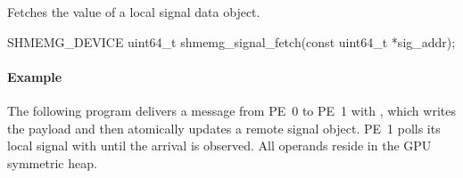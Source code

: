 \label{subsec:gc_signal_fetch}

Fetches the value of a local signal data object.

\begin{apidefinition}
\begin{Csynopsis}
SHMEMG_DEVICE uint64_t shmemg_signal_fetch(const uint64_t *sig_addr);
\end{Csynopsis}

\begin{apiarguments}
\end{apiarguments}


\end{apidefinition}

\paragraph*{\textbf{Example}}\mbox{}\par\nobreak
The following program delivers a message from \ac{PE}~0 to \ac{PE}~1 with
, which writes the payload and then atomically
updates a remote signal object. \ac{PE}~1 polls its local signal with
 until the arrival is observed. All operands reside
in the \ac{GPU} symmetric heap.



